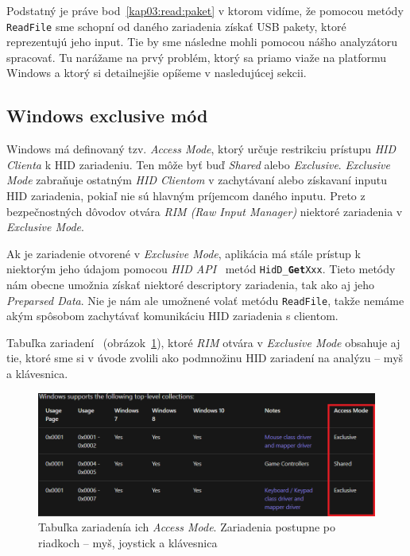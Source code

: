 Podstatný je práve bod~\ref{kap03:read:paket} v ktorom vidíme, že pomocou metódy \texttt{ReadFile} sme schopní od daného zariadenia získať USB pakety, ktoré reprezentujú jeho input. Tie by sme následne mohli pomocou nášho analyzátoru spracovať. Tu narážame na prvý problém, ktorý sa priamo viaže na platformu Windows a ktorý si detailnejšie opíšeme v nasledujúcej sekcii.

\subsection*{Windows exclusive mód}
Windows má definovaný tzv. \textit{Access Mode}, ktorý určuje restrikciu prístupu \textit{HID Clienta} k HID zariadeniu. 
Ten môže byť buď \textit{Shared} alebo \textit{Exclusive}. \textit{Exclusive Mode} zabraňuje ostatným \textit{HID Clientom} v zachytávaní alebo získavaní inputu HID zariadenia, pokiaľ nie sú hlavným príjemcom daného inputu. Preto z bezpečnostných dôvodov otvára \textit{RIM (Raw Input Manager)} niektoré zariadenia v \textit{Exclusive Mode}.

Ak je zariadenie otvorené v \textit{Exclusive Mode}, aplikácia má stále prístup k niektorým jeho údajom pomocou  \textit{HID API}~\cite{hid_api} metód  \texttt{HidD\_\textbf{Get}Xxx}. Tieto metódy nám obecne umožnia získať niektoré descriptory zariadenia, tak ako aj jeho \textit{Preparsed Data}. Nie je nám ale umožnené volať metódu \texttt{ReadFile}, takže nemáme akým spôsobom zachytávať komunikáciu HID zariadenia s clientom.

Tabuľka zariadení~\cite{hid_access} (obrázok~\ref{obr:kap3:access_mode}), ktoré \textit{RIM} otvára v \textit{Exclusive Mode} obsahuje aj tie, ktoré sme si v úvode zvolili ako podmnožinu HID zariadení na analýzu -- myš a klávesnica.

\begin{figure}[!htb]
	\centering
	\includegraphics[width=\textwidth]{img/kap3_access_mode}
	\caption{Tabuľka zariadenía ich \textit{Access Mode}. Zariadenia postupne po riadkoch -- myš, joystick a klávesnica}
	\label{obr:kap3:access_mode}
\end{figure}

